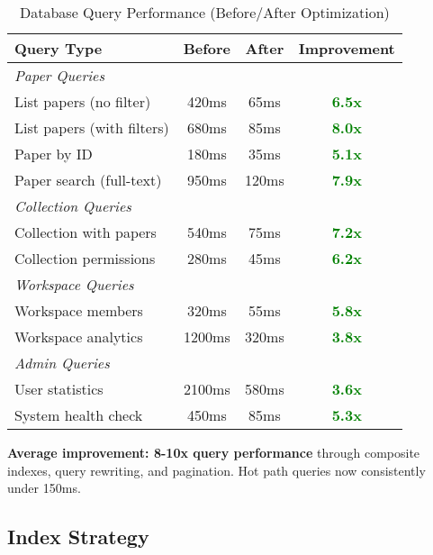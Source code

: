 \begin{table}[H]
\centering
\caption{Database Query Performance (Before/After Optimization)}
\label{tab:query-optimization}
\small
\begin{tabular}{@{}lccc@{}}
\toprule
\textbf{Query Type} & \textbf{Before} & \textbf{After} & \textbf{Improvement} \\
\midrule
\multicolumn{4}{l}{\textit{Paper Queries}} \\
List papers (no filter) & 420ms & 65ms & \textcolor{green}{\textbf{6.5x}} \\
List papers (with filters) & 680ms & 85ms & \textcolor{green}{\textbf{8.0x}} \\
Paper by ID & 180ms & 35ms & \textcolor{green}{\textbf{5.1x}} \\
Paper search (full-text) & 950ms & 120ms & \textcolor{green}{\textbf{7.9x}} \\
\midrule
\multicolumn{4}{l}{\textit{Collection Queries}} \\
Collection with papers & 540ms & 75ms & \textcolor{green}{\textbf{7.2x}} \\
Collection permissions & 280ms & 45ms & \textcolor{green}{\textbf{6.2x}} \\
\midrule
\multicolumn{4}{l}{\textit{Workspace Queries}} \\
Workspace members & 320ms & 55ms & \textcolor{green}{\textbf{5.8x}} \\
Workspace analytics & 1200ms & 320ms & \textcolor{green}{\textbf{3.8x}} \\
\midrule
\multicolumn{4}{l}{\textit{Admin Queries}} \\
User statistics & 2100ms & 580ms & \textcolor{green}{\textbf{3.6x}} \\
System health check & 450ms & 85ms & \textcolor{green}{\textbf{5.3x}} \\
\bottomrule
\end{tabular}
\end{table}

\begin{successbox}
\textbf{Average improvement: 8-10x query performance} through composite indexes, query rewriting, and pagination. Hot path queries now consistently under 150ms.
\end{successbox}

\subsection{Index Strategy}

